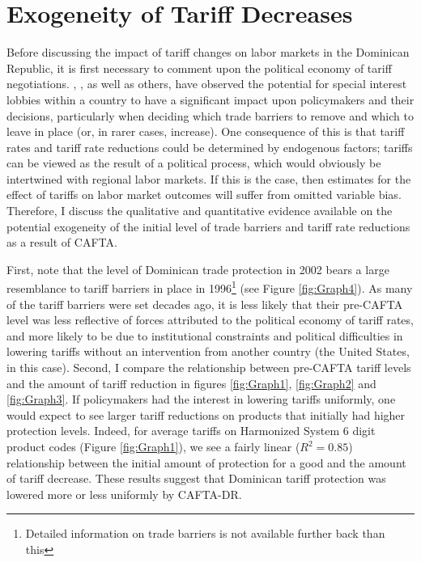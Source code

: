 \documentclass[12pt]{article}
\begin{document}
\vspace{-10pt}
\section{Exogeneity of Tariff Decreases}
\label{sec:Exogeneity}
Before discussing the impact of tariff changes on labor markets in
the Dominican Republic, it is first necessary to comment upon the political economy of
tariff negotiations. \citet{grossman}, \citet{brock1978}, as well as others, have observed the potential
for special interest lobbies within a country to have a significant impact upon policymakers
and their decisions, particularly when deciding which trade barriers to remove and which
to leave in place (or, in rarer cases, increase). One consequence of this is that tariff rates
and tariff rate reductions could be determined by endogenous factors; tariffs can be viewed as the
result of a political process, which would  obviously be intertwined with regional
labor markets. If this is the case, then estimates for the effect of tariffs on labor market
outcomes will suffer from omitted variable bias. Therefore, I discuss the qualitative and
quantitative evidence available on the potential exogeneity of the initial level of
trade barriers and tariff rate reductions as a result
of CAFTA. 

First, note that the level of Dominican trade protection in 2002 bears a large resemblance
to tariff barriers in place in 1996\footnote{Detailed
information on trade barriers is not available further back than this} (see Figure \ref{fig:Graph4}).
As many of the tariff barriers were set decades ago, it is less likely that their pre-CAFTA level 
was less reflective of forces attributed to the political economy of tariff rates, and 
more likely to be due to institutional constraints and
political difficulties in lowering tariffs without an intervention from another country (the
United States, in this case). 
Second, I compare the relationship between pre-CAFTA tariff
levels and the amount of tariff reduction in figures \ref{fig:Graph1}, \ref{fig:Graph2} and 
\ref{fig:Graph3}. If policymakers had the interest
in lowering tariffs uniformly, one would expect to see larger tariff reductions on products that
initially had higher protection levels. Indeed, for average tariffs on Harmonized System 
6 digit product codes (Figure \ref{fig:Graph1}), we see a fairly linear ($R^2=0.85$) relationship 
between the initial amount of protection for a good and
the amount of tariff decrease. These results suggest that Dominican tariff protection
was lowered more or less uniformly by CAFTA-DR.
\end{document}
